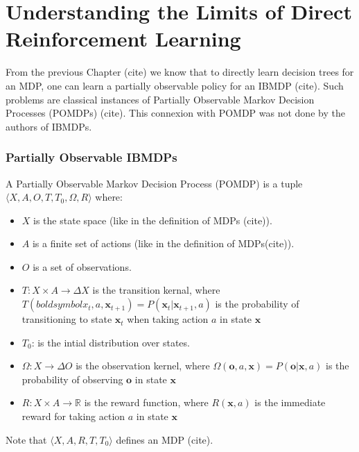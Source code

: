 \chapter{Understanding the Limits of Direct Reinforcement Learning}

From the previous Chapter (cite) we know that to directly learn decision trees for an MDP, one can learn a partially observable policy for an IBMDP (cite).
Such problems are classical instances of Partially Observable Markov Decision Processes (POMDPs) (cite). This connexion with POMDP was not done by the authors of IBMDPs. 

\subsection{Partially Observable IBMDPs}


\begin{definition}
A Partially Observable Markov Decision Process (POMDP) is a tuple $\langle X, A, O, T, T_0, \Omega, R\rangle$ where:
\begin{itemize}
    \item $X$ is the state space (like in the definition of MDPs (cite)).
    \item $A$ is a finite set of actions (like in the definition of MDPs(cite)).
    \item $O$ is a set of observations.
    \item $T: X \times A \rightarrow \Delta X$ is the transition kernal, where $T(boldsymbol{x}_t, a, \boldsymbol{x}_{t+1}) = P(\boldsymbol{x}_t|\boldsymbol{x}_{t+1}, a)$ is the probability of transitioning to state $\boldsymbol{x}_{t}$ when taking action $a$ in state $\boldsymbol{x}$
    \item $T_0$: is the intial distribution over states. 
    \item $\Omega: X \rightarrow \Delta O$ is the observation kernel, where $\Omega(\boldsymbol{o}, a, \boldsymbol{x}) = P(\boldsymbol{o}|\boldsymbol{x}, a)$ is the probability of observing $\boldsymbol{o}$ in state $\boldsymbol{x}$
    \item $R: X \times A \rightarrow \mathbb{R}$ is the reward function, where $R(\boldsymbol{x}, a)$ is the immediate reward for taking action $a$ in state $\boldsymbol{x}$
\end{itemize}
Note that $\langle X, A, R, T, T_0 \rangle$ defines an MDP (cite).
\end{definition}

